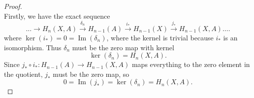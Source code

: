 \documentclass{article}
\newcommand{\fn}[3]{#1 \colon #2 \rightarrow #3}
\newcommand{\ra}{\rightarrow}
\DeclareMathOperator{\im}{Im}
\begin{document}
\begin{proof} \text{} \\
  Firstly, we have the exact sequence \[
    \hdots \ra H_n(X,A) \xrightarrow{\delta_n} H_{n-1}(A) \xrightarrow{i_*} H_{n-1}(X) \xrightarrow{j_*} H_{n-1}(X,A) \hdots.
  \] where $\ker(i_*) = 0 = \im(\delta_n)$, where the kernel is trivial because
  $i_*$ is an isomorphism. Thus $\delta_n$ must be the zero map with kernel \[
    \ker(\delta_n) = H_n(X,A).
  \]
  Since $\fn{j_* \circ i_*}{H_{n-1}(A)}{H_{n-1}(X,A)}$ maps everything to the
  zero element in the quotient, $j_*$ must be the zero map, so
  \[
    0 = \im(j_*) = \ker(\delta_n) = H_n(X,A).
  \]
\end{proof}
\pagebreak
\end{document}
